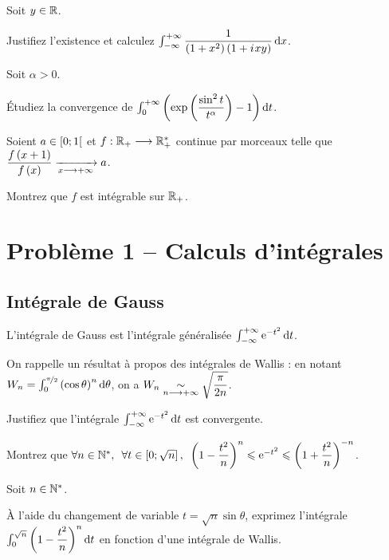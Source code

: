 \begin{exo}
Soit \(y\in\mathbb{R}\).

Justifiez l'existence et calculez \(\int_{\minf}^{\pinf}\dfrac{1}{\paren{1+x^2}\paren{1+\i xy}}\odif{x}\).
\end{exo}

\begin{exo}
Soit \(\alpha>0\).

Étudiez la convergence de \(\int_0^{\pinf}\paren{\exp\paren{\dfrac{\sin^2t}{t^\alpha}}-1}\odif{t}\).
\end{exo}

\begin{exo}
Soient \(a\in\left[0;1\right[\) et \(f:\mathbb{R}_+\longrightarrow\mathbb{R}_+^*\) continue par morceaux telle que \(\dfrac{f\left(x+1\right)}{f\left(x\right)}\xrightarrow[x\longrightarrow+\infty]{}a\).

Montrez que \(f\) est intégrable sur \(\mathbb{R}_+\).
\end{exo}

\section*{Problème 1 -- Calculs d'intégrales}

\subsection*{Intégrale de Gauss}

L'intégrale de Gauss est l'intégrale généralisée \(\int_{\minf}^{\pinf}\e{-t^2}\odif{t}\).

On rappelle un résultat à propos des intégrales de Wallis : en notant \(W_n=\int_0^{\nicefrac{\pi}{2}}\paren{\cos\theta}^n\odif{\theta}\), on a \(W_n\underset{n\longrightarrow+\infty}{\sim}\sqrt{\dfrac{\pi}{2n}}\).

\setcounter{q}{0}
\begin{q}
Justifiez que l'intégrale \(\int_{\minf}^{\pinf}\e{-t^2}\odif{t}\) est convergente.
\end{q}

\begin{q}
Montrez que \(\quantifs{\forall n\in\Ns;\forall t\in\intervii{0}{\sqrt{n}}}\paren{1-\dfrac{t^2}{n}}^n\leq\e{-t^2}\leq\paren{1+\dfrac{t^2}{n}}^{-n}\).
\end{q}

\begin{q}
Soit \(n\in\mathbb{N}^*\).

À l'aide du changement de variable \(t=\sqrt{n}\sin\theta\), exprimez l'intégrale \(\int_0^{\sqrt{n}}\paren{1-\dfrac{t^2}{n}}^{n}\odif{t}\) en fonction d'une intégrale de Wallis.
\end{q}

